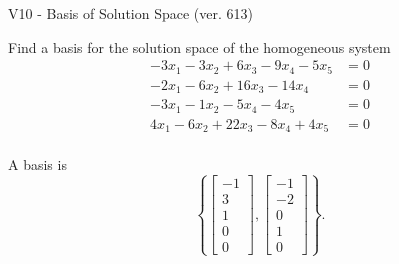 \begin{exercise}
  \begin{exerciseTitle}V10 - Basis of Solution Space (ver. 613)\end{exerciseTitle}
  \begin{exerciseStatement}
    Find a basis for the solution space of the homogeneous system 
\begin{align*}
 -3 x_ 1 -3 x_ 2 + 6 x_ 3 -9 x_ 4 -5 x_ 5 &= 0  \\ 
  -2 x_ 1 -6 x_ 2 + 16 x_ 3 -14 x_ 4 &= 0  \\ 
  -3 x_ 1 -1 x_ 2 -5 x_ 4 -4 x_ 5 &= 0  \\ 
  4 x_ 1 -6 x_ 2 + 22 x_ 3 -8 x_ 4 + 4 x_ 5 &= 0  \\ 
 \end{align*}


 
  \end{exerciseStatement}

  \begin{exerciseAnswer}
   A basis is   
\[\left\{\left[\begin{array}{c}
-1 \\
3 \\
1 \\
0 \\
0
\end{array}\right] , \left[\begin{array}{c}
-1 \\
-2 \\
0 \\
1 \\
0
\end{array}\right]\right\}.\]

  


  \end{exerciseAnswer}
\end{exercise}